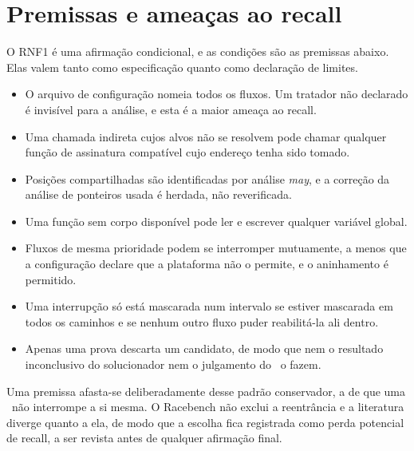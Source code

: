 \section{Premissas e ameaças ao recall}
\label{sec:premissas}

O RNF1 é uma afirmação condicional, e as condições são as premissas abaixo.
Elas valem tanto como especificação quanto como declaração de limites.

\begin{itemize}
  \item O arquivo de configuração nomeia todos os fluxos. Um tratador não
    declarado é invisível para a análise, e esta é a maior ameaça ao recall.
  \item Uma chamada indireta cujos alvos não se resolvem pode chamar qualquer
    função de assinatura compatível cujo endereço tenha sido tomado.
  \item Posições compartilhadas são identificadas por análise \textit{may}, e a
    correção da análise de ponteiros usada é herdada, não reverificada.
  \item Uma função sem corpo disponível pode ler e escrever qualquer variável
    global.
  \item Fluxos de mesma prioridade podem se interromper mutuamente, a menos que
    a configuração declare que a plataforma não o permite, e o aninhamento é
    permitido.
  \item Uma interrupção só está mascarada num intervalo se estiver mascarada em
    todos os caminhos e se nenhum outro fluxo puder reabilitá-la ali dentro.
  \item Apenas uma prova descarta um candidato, de modo que nem o resultado
    inconclusivo do solucionador nem o julgamento do \llm\ o fazem.
\end{itemize}

Uma premissa afasta-se deliberadamente desse padrão conservador, a de que uma
\isr\ não interrompe a si mesma. O Racebench não exclui a reentrância e a
literatura diverge quanto a ela, de modo que a escolha fica registrada como
perda potencial de recall, a ser revista antes de qualquer afirmação final.
